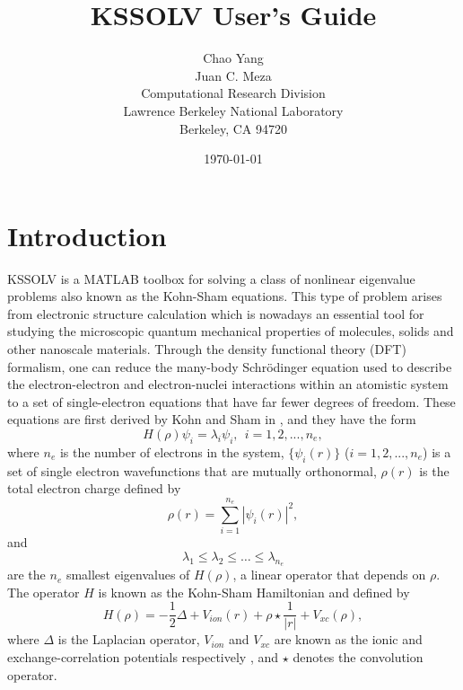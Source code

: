 \documentclass[11pt]{book}
\begin{document}
\title{KSSOLV User's Guide}
\author{
Chao Yang\\
Juan C. Meza\\
Computational Research Division\\
Lawrence Berkeley National Laboratory \\
Berkeley, CA 94720
}
\date{\today}
\maketitle
\tableofcontents

\chapter{Introduction} \label{chap:intro}
KSSOLV is a MATLAB toolbox for solving a class of nonlinear eigenvalue
problems also known as the Kohn-Sham equations. This type of problem arises 
from electronic structure calculation which is nowadays an essential tool 
for studying the microscopic quantum mechanical properties of molecules,
solids and other nanoscale materials.  Through the density functional theory (DFT) 
formalism, one can reduce the many-body Schr\"{o}dinger equation used to describe the 
electron-electron and electron-nuclei interactions within an atomistic
system to a set of single-electron equations that have far
fewer degrees of freedom.  These equations are first derived by Kohn and Sham
in \cite{kohnsham}, and they have the form
\begin{equation}
H(\rho) \psi_i = \lambda_i \psi_i, \ \ i = 1, 2, ..., n_e, \label{ev1} 
\end{equation}
where $n_e$ is the number of electrons in the system, 
$\{\psi_i(r)\}$ ($i = 1,2,..., n_e$) is a set of single electron
wavefunctions that are mutually orthonormal, $\rho(r)$ is the total electron
charge defined by
\begin{equation}
\rho(r) =  \sum_{i=1}^{n_e} | \psi_i(r) |^2,
\label{chargeden}
\end{equation}
and 
\[
\lambda_1 \leq \lambda_2 \leq \hdots \leq \lambda_{n_e}
\] 
are the $n_e$ smallest eigenvalues of $H(\rho)$, a linear operator 
that depends on $\rho$.  The operator $H$ is known as the Kohn-Sham 
Hamiltonian and defined by
\begin{equation}
H(\rho) = -\frac{1}{2}\Delta + V_{ion}(r) + \rho \star \frac{1}{|r|}
+ V_{xc}(\rho),
\label{ksham}
\end{equation}
where $\Delta$ is the Laplacian operator, $V_{ion}$ and $V_{xc}$ are known as
the ionic and exchange-correlation potentials respectively \cite{kohnsham},
and $\star$ denotes the convolution operator.
\end{document}
